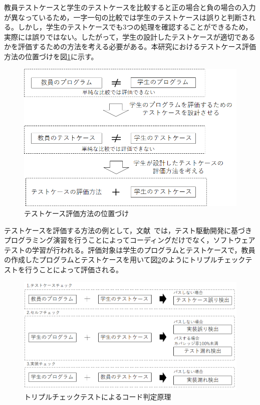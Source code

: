 \documentclass{tpu-sotu}
\begin{document}
教員テストケースと学生のテストケースを比較すると正の場合と負の場合の入力が異なっているため，一字一句の比較では学生のテストケースは誤りと判断される。しかし，学生のテストケースでも3つの処理を確認することができるため，実際には誤りではない。したがって，学生の設計したテストケースが適切であるかを評価するための方法を考える必要がある。本研究におけるテストケース評価方法の位置づけを図\ref{a1}に示す。
\begin{figure}[h]
  \centering
  \includegraphics[width=130mm]{テストケース評価方法の位置づけ.png}
  \caption{テストケース評価方法の位置づけ}
  \label{a1}
\end{figure}

テストケースを評価する方法の例として，文献~\cite{a0}では，テスト駆動開発に基づきプログラミング演習を行うことによってコーディングだけでなく，ソフトウェアテストの学習が行われる。評価対象は学生のプログラムとテストケースで，教員の作成したプログラムとテストケースを用いて図\ref{a2}のようにトリプルチェックテストを行うことによって評価される。

\begin{figure}[h]
  \centering
  \includegraphics[width=130mm]{トリプルチェック.png}
  \caption{トリプルチェックテストによるコード判定原理}
  \label{a2}
\end{figure}
\end{document}
